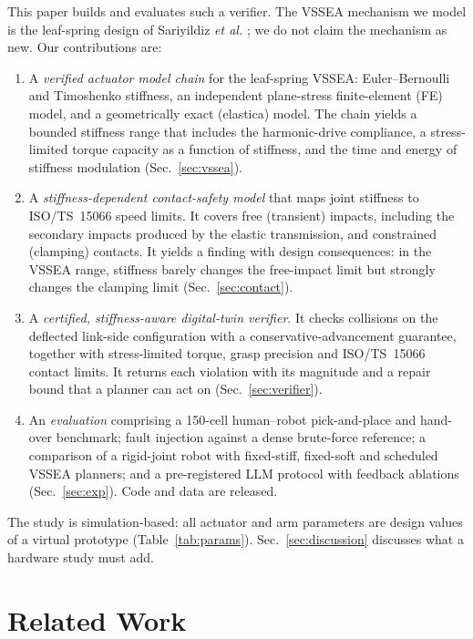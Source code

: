\documentclass[journal]{IEEEtran}
\begin{document}
This paper builds and evaluates such a verifier. The VSSEA mechanism we model is the leaf-spring design of Sariyildiz \emph{et al.} \cite{sariyildiz2023}; we do not claim the mechanism as new. Our contributions are:
\begin{enumerate}
\item A \emph{verified actuator model chain} for the leaf-spring VSSEA: Euler--Bernoulli and Timoshenko stiffness, an independent plane-stress finite-element (FE) model, and a geometrically exact (elastica) model. The chain yields a bounded stiffness range that includes the harmonic-drive compliance, a stress-limited torque capacity as a function of stiffness, and the time and energy of stiffness modulation (Sec.~\ref{sec:vssea}).
\item A \emph{stiffness-dependent contact-safety model} that maps joint stiffness to ISO/TS~15066 speed limits. It covers free (transient) impacts, including the secondary impacts produced by the elastic transmission, and constrained (clamping) contacts. It yields a finding with design consequences: in the VSSEA range, stiffness barely changes the free-impact limit but strongly changes the clamping limit (Sec.~\ref{sec:contact}).
\item A \emph{certified, stiffness-aware digital-twin verifier}. It checks collisions on the deflected link-side configuration with a conservative-advancement guarantee, together with stress-limited torque, grasp precision and ISO/TS~15066 contact limits. It returns each violation with its magnitude and a repair bound that a planner can act on (Sec.~\ref{sec:verifier}).
\item An \emph{evaluation} comprising a 150-cell human--robot pick-and-place and hand-over benchmark; fault injection against a dense brute-force reference; a comparison of a rigid-joint robot with fixed-stiff, fixed-soft and scheduled VSSEA planners; and a pre-registered LLM protocol with feedback ablations (Sec.~\ref{sec:exp}). Code and data are released.
\end{enumerate}
The study is simulation-based: all actuator and arm parameters are design values of a virtual prototype (Table~\ref{tab:params}). Sec.~\ref{sec:discussion} discusses what a hardware study must add.

\section{Related Work}
\end{document}
